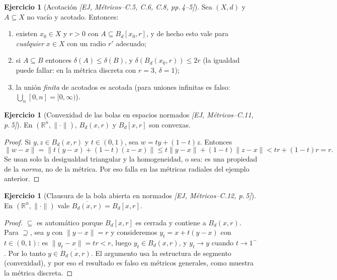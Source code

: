 \documentclass[11pt,a4paper]{article}
\theoremstyle{definition}
\newtheorem{ejercicio}[definicion]{Ejercicio}
\theoremstyle{plain}
\newcommand{\fnt}[1]{{\normalfont\small\itshape\color{gray!150!black}[#1]}}
\newcommand{\R}{\mathbb{R}}
\newcommand{\cl}[1]{\overline{#1}}
\newcommand{\Bola}[2]{B_d(#1,#2)}
\newcommand{\Bolac}[2]{B_d[#1,#2]}
\newcommand{\norm}[1]{\lVert #1 \rVert}
\begin{document}
\begin{ejercicio}[Acotación \fnt{EJ, Métricos--C.5, C.6, C.8, pp.\,4--5}]
Sea $(X,d)$ y $A\subseteq X$ no vacío y acotado. Entonces:
\begin{enumerate}[label=(\roman*),leftmargin=2.2em,itemsep=0pt]
\item existen $x_0\in X$ y $r>0$ con $A\subseteq \Bolac{x_0}{r}$, y de hecho esto vale para \emph{cualquier} $x\in X$ con un radio $r'$ adecuado;
\item si $A\subseteq B$ entonces $\delta(A)\le\delta(B)$, y $\delta(\Bola{x_0}{r})\le 2r$ (la igualdad puede fallar: en la métrica discreta con $r=3$, $\delta=1$);
\item la unión \emph{finita} de acotados es acotada (para uniones infinitas es falso: $\bigcup_n [0,n]=[0,\infty)$).
\end{enumerate}
\end{ejercicio}

\begin{ejercicio}[Convexidad de las bolas en espacios normados \fnt{EJ, Métricos--C.11, p.\,5}]
En $(\R^n,\norm{\cdot})$, $\Bola{x}{r}$ y $\Bolac{x}{r}$ son convexas.
\end{ejercicio}

\begin{proof}
Si $y,z\in\Bola{x}{r}$ y $t\in(0,1)$, sea $w=ty+(1-t)z$. Entonces
\[
\norm{w-x}=\norm{t(y-x)+(1-t)(z-x)}\le t\norm{y-x}+(1-t)\norm{z-x}< tr+(1-t)r=r .
\]
Se usan solo la desigualdad triangular y la homogeneidad, o sea: es una propiedad de la \emph{norma}, no de la métrica. Por eso falla en las métricas radiales del ejemplo anterior.
\end{proof}

\begin{ejercicio}[Clausura de la bola abierta en normados \fnt{EJ, Métricos--C.12, p.\,5}]
En $(\R^n,\norm{\cdot})$ vale $\cl{\Bola{x}{r}}=\Bolac{x}{r}$.
\end{ejercicio}

\begin{proof}
$\subseteq$ es automático porque $\Bolac{x}{r}$ es cerrada y contiene a $\Bola{x}{r}$. Para $\supseteq$, sea $y$ con $\norm{y-x}=r$ y consideremos $y_t=x+t(y-x)$ con $t\in(0,1)$: es $\norm{y_t-x}=tr<r$, luego $y_t\in \Bola{x}{r}$, y $y_t\to y$ cuando $t\to 1^-$. Por lo tanto $y\in\cl{\Bola{x}{r}}$. El argumento usa la estructura de segmento (convexidad), y por eso el resultado es falso en métricos generales, como muestra la métrica discreta.
\end{proof}
\end{document}
